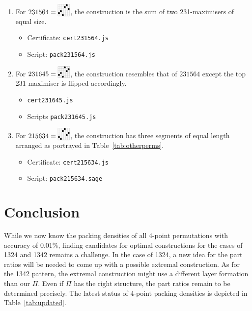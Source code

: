 \begin{enumerate}
\item For $231564 = \bcaobca$, the construction is the sum of two 231-maximisers of equal size.
  \begin{itemize}
  \item Certificate: \texttt{cert231564.js}
  \item Script: \texttt{pack231564.js}
  \end{itemize}
\item For $231645 = \bcaocab$, the construction resembles that of $231564$ except the top 231-maximiser is flipped accordingly.
  \begin{itemize}
  \item \texttt{cert231645.js}
  \item Scripts \texttt{pack231645.js}
  \end{itemize}
\item For $215634 = \baoabmab$, the construction has three segments of equal length arranged as portrayed in Table~\ref{tab:otherperms}.
  \begin{itemize}
  \item Certificate: \texttt{cert215634.js}
  \item Script: \texttt{pack215634.sage}
  \end{itemize}
\end{enumerate}

\section{Conclusion}

While we now know the packing densities of all 4-point permutations with accuracy of 0.01\%, finding candidates for optimal constructions for the cases of 1324 and 1342 remains a challenge. In the case of 1324, a new idea for the part ratios will be needed to come up with a possible extremal construction. As for the 1342 pattern, the extremal construction might use a different layer formation than our $\Pi$. Even if $\Pi$ has the right structure, the part ratios remain to be determined precisely. The latest status of 4-point packing densities is depicted in Table~\ref{tab:updated}.


